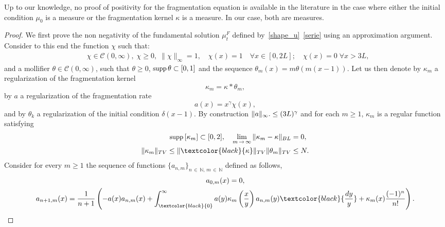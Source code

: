 \documentclass[AHL,Unicode,longabstracts,published]{cedram}
\newcommand*\dst{\displaystyle}
\newcommand*\N{\mathbb{N}}
\newcommand{\clC}{\mathcal{C}}
\newcommand{\MT}[1]{\textcolor{black}{#1}}
\newcommand*\supp{{\mbox{\small\rm supp}}\,}
\let\oldforall\forall
\renewcommand*{\forall}{\mathrel{\oldforall}}
\begin{document}
\begin{rema}
Up to our knowledge, no proof of positivity for the fragmentation equation is available in the literature in the case where either the initial condition $\mu_0$ is a measure or the fragmentation kernel $\kappa$ is a measure. In our case, both are measures.
\end{rema}


\begin{proof}
We first prove the non negativity of the fundamental solution $\mu_t^F$ defined by~\eqref{shape_u}~\eqref{serie} using an approximation argument. Consider to this end the function $\chi$ such that:
\begin{align*}
&\chi\in \clC(0, \infty),\;\chi\ge 0,\;\|\chi\|_\infty=1, \quad \chi(x)=1\quad\forall x\in [0, 2L];\quad
\chi(x)=0\;\forall x>3L,
\end{align*}
and a mollifier $\theta\in \clC(0, \infty)$, such that $\theta \ge 0$, $\supp \theta\subset [0, 1]$ and the sequence $\theta _m(x)=m\theta (m(x-1))$. Let us then denote by $\kappa_m$ a regularization of the fragmentation kernel
\begin{equation*}
\kappa _m=\kappa \ast \theta_m,
\end{equation*}
by $a$ a regularization of the fragmentation rate
\begin{equation*}
a(x)=x^{\gamma}\chi(x),
\end{equation*}
and by $\theta_k$ a regularization of the initial condition $\delta(x-1)$. By construction $\|a\|_\infty. \linebreak\le (3L)^\gamma$ and for each $m\ge 1$, $\kappa _m$ is a regular function satisfying
\begin{equation}
\label{kmBL2}
\begin{split}
\supp[\kappa_m]\subset [0, 2], \quad \lim_{m\,\to \,\infty}\|\kappa _m-\kappa\|_{BL} &=0, \\
\|\kappa _m\|_{TV}\le \|\MT{\kappa}\|_{TV}\|\theta_m\|_{TV} &\le N.
\end{split}
\end{equation}
Consider for every $m\ge 1$ the sequence of functions $\{a_{n, m}\}_{n\,\in\,\N,\,m\,\in\,\N}$ defined as follows,
\begin{multline}\label{inductionB}
 a_{0, m}(x) =0,\\
a_{n+1, m}(x) = \dfrac{1}{n+1}\left(-a(x)a_{n, m}(x)+ \dst\int_{\MT{0}}^{\infty} a(y) \kappa_m \left(\dfrac{x}{y} \right)a_{n, m}(y)\MT{\dfrac{dy}{y}} + \kappa_m(x) \dfrac{(-1)^n}{n!}\right).
\end{multline}

\end{proof}
\end{document}
